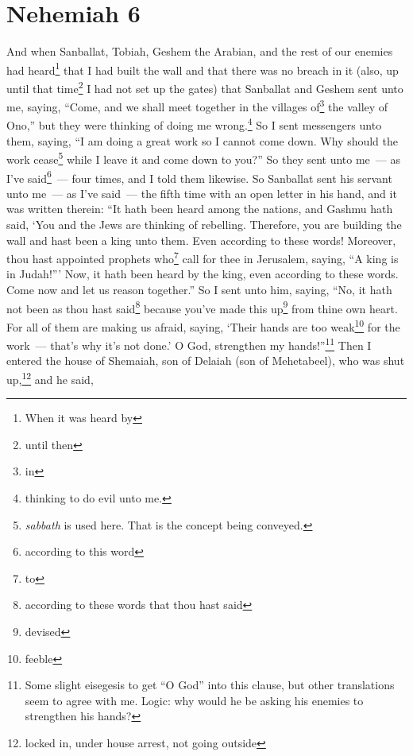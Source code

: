 \section{Nehemiah 6}\label{Nehemiah 6}
\begin{enumerate}
     And when Sanballat, Tobiah, Geshem the Arabian, and the rest of our enemies had heard\footnote{When it was heard by} that I had built the wall and that there was no breach in it (also, up until that time\footnote{until then} I had not set up the gates)%
     that Sanballat and Geshem sent unto me, saying, ``Come, and we shall meet together in the villages of\footnote{in} the valley of Ono,'' but they were thinking of doing me wrong.\footnote{thinking to do evil unto me.}%
     So I sent messengers unto them, saying, ``I am doing a great work so I cannot come down. Why should the work cease\footnote{\emph{sabbath} is used here. That is the concept being conveyed.} while I leave it and come down to you?''%
     So they sent unto me~--- as I've said\footnote{according to this word}~--- four times, and I told them likewise.%
     So Sanballat sent his servant unto me~--- as I've said~--- the fifth time with an open letter in his hand,%
     and it was written therein: ``It hath been heard among the nations, and Gashmu hath said, `You and the Jews are thinking of rebelling. Therefore, you are building the wall and hast been a king unto them. Even according to these words!%
     Moreover, thou hast appointed prophets who\footnote{to} call for thee in Jerusalem, saying, ``A king is in Judah!''' Now, it hath been heard by the king, even according to these words. Come now and let us reason together.''%
     So I sent unto him, saying, ``No, it hath not been as thou hast said\footnote{according to these words that thou hast said} because you've made this up\footnote{devised} from thine own heart.%
     For all of them are making us afraid, saying, `Their hands are too weak\footnote{feeble} for the work~--- that's why it's not done.' O God, strengthen my hands!''\footnote{Some slight eisegesis to get ``O God'' into this clause, but other translations seem to agree with me. Logic: why would he be asking his enemies to strengthen his hands?}%
     Then I entered the house of Shemaiah, son of Delaiah (son of Mehetabeel), who was shut up,\footnote{locked in, under house arrest, not going outside} and he said,


\end{enumerate}
